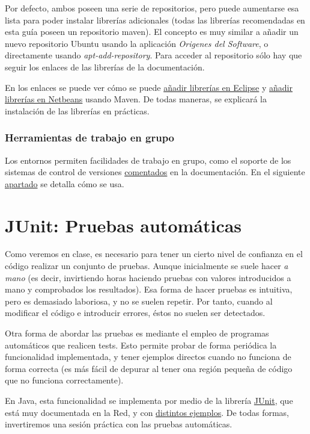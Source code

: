 \documentclass[11pt]{article}
\begin{document}
Por defecto, ambos poseen una serie de repositorios, pero puede aumentarse esa lista para poder instalar
librerías adicionales (todas las librerías recomendadas en esta guía poseen un repositorio maven). El concepto
es muy similar a añadir un nuevo repositorio Ubuntu usando la aplicación \emph{Origenes del Software}, o directamente
usando \emph{apt-add-repository}. Para acceder al repositorio sólo hay que seguir los enlaces de las librerías
de la documentación.


En los enlaces se puede ver cómo se puede \href{http://m2eclipse.sonatype.org/adding-project-dependencies-in-m2eclipse.html}{añadir librerías en Eclipse} y \href{http://wiki.netbeans.org/MavenBestPractices}{añadir librerías en Netbeans}
usando Maven. 
De todas maneras, se explicará la instalación de las librerías en prácticas.
\subsubsection{Herramientas de trabajo en grupo}
\label{sec-3-2-6}




Los entornos permiten facilidades de trabajo en grupo, como el soporte de los sistemas de control de versiones
\hyperref[svc]{comentados} en la documentación. En el siguiente \hyperref[soporte_svn]{apartado} se detalla cómo se usa.
\section{JUnit: Pruebas automáticas}
\label{sec-4}




Como veremos en clase, es necesario para tener un cierto nivel de confianza en el código realizar un conjunto
de pruebas. Aunque inicialmente se suele hacer \emph{a mano} (es decir, invirtiendo horas haciendo pruebas con
valores introducidos a mano y comprobados los resultados). Esa forma de hacer pruebas es intuitiva, pero es
demasiado laboriosa, y no se suelen repetir. Por tanto, cuando al modificar el código e introducir errores, éstos
no suelen ser detectados. 


Otra forma de abordar las pruebas es mediante el empleo de programas automáticos que realicen tests. Esto permite
probar de forma periódica la funcionalidad implementada, y tener ejemplos directos cuando no funciona de forma
correcta (es más fácil de depurar al tener ona región pequeña de código que no funciona correctamente). 


En Java, esta funcionalidad se implementa por medio de la librería \href{http://junit.sourceforge.net/}{JUnit}, que está muy documentada en la
Red, y con \href{http://www.slideshare.net/tom.zimmermann/unit-testing-with-junit}{distintos ejemplos}. De todas formas, invertiremos una sesión práctica con las pruebas automáticas.
\end{document}
